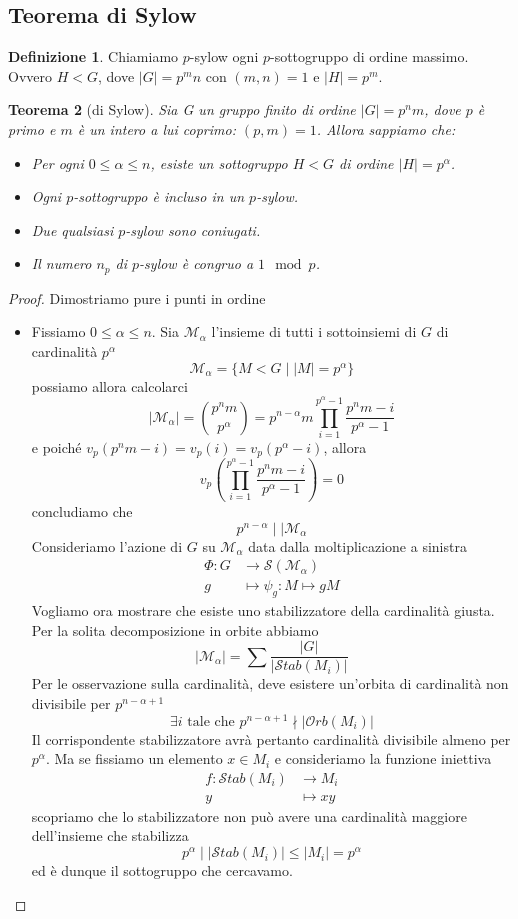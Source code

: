 \documentclass[a4paper]{article}
\newtheorem{theorem}{Teorema}[section]
\theoremstyle{remark}
\theoremstyle{definition}
\newtheorem{definition}[theorem]{Definizione}
\newcommand{\Orb}[1]{\mathcal{O}rb\left( #1 \right)}
\newcommand{\Stab}[1]{\mathcal{S}tab\left( #1 \right)}
\newcommand{\fun}[5]{\begin{align*}
	#1 \colon #2 &\to #3 \\
	#4 &\mapsto #5
	\end{align*}}
\begin{document}
\subsection{Teorema di Sylow}
\begin{multicols}{2}
	\begin{definition}
		Chiamiamo $ p $-sylow ogni $ p $-sottogruppo di ordine massimo. Ovvero $ H < G $, dove $ |G| = p^mn $ con $ (m, n) = 1 $ e $ |H| = p^m $.
	\end{definition}
\begin{theorem}[di Sylow]\label{sylow}
	Sia G un gruppo finito di ordine $ |G| = p^nm  $, dove $ p $ è primo e $ m $ è un intero a lui coprimo: $ (p, m) = 1 $. Allora sappiamo che:
	\begin{itemize}
		\item[$ \exists $.] Per ogni $ 0 \leq \alpha \leq n $, esiste un sottogruppo $ H<G $ di ordine $|H| = p^\alpha $.
		\item[$ \subseteq $.] Ogni $ p $-sottogruppo è incluso in un $ p $-sylow.
		\item[$ \varphi_g $.] Due qualsiasi $ p $-sylow sono coniugati.
		\item[$ n_p $.] Il numero $ n_p $ di $ p $-sylow è congruo a $ 1 \mod{p}$.
	\end{itemize}
\end{theorem}
\begin{proof}
		Dimostriamo pure i punti in ordine
	\begin{itemize}

		\item[$ \exists $.] Fissiamo $ 0 \leq \alpha \leq n $. Sia $ \mathcal{M}_\alpha $ l'insieme di tutti i sottoinsiemi di $ G $ di cardinalità $ p^\alpha $ \[ \mathcal{M}_\alpha = \{ M < G \mid |M| = p^\alpha \} \] possiamo allora calcolarci
		\[ |\mathcal{M}_\alpha| = {p^nm \choose p^\alpha} = p^{n-\alpha}m \prod_{i = 1}^{p^\alpha - 1}\frac{p^nm-i}{p^\alpha -1} \]
		e poiché $ v_p({p^nm-i}) = v_p(i) =  v_p({p^\alpha -i}) $, allora
		$$  v_p\left(\prod_{i = 1}^{p^\alpha - 1}\frac{p^nm-i}{p^\alpha -1}\right) =  0  $$
		concludiamo che
		\[ p^{n-\alpha} \mid\mid \mathcal{M}_\alpha \]
		Consideriamo l'azione di $ G $ su $ \mathcal{M}_\alpha $ data dalla moltiplicazione a sinistra
		\fun{\Phi}{G}{\mathcal{S}(\mathcal{M}_\alpha)}{g}{\psi_g: M \mapsto gM}
		Vogliamo ora mostrare che esiste uno stabilizzatore della cardinalità giusta. Per la solita decomposizione in orbite abbiamo
		\[ |\mathcal{M}_\alpha| = \sum \frac{|G|}{|\Stab{M_i}|} \]
		Per le osservazione sulla cardinalità, deve esistere un'orbita di cardinalità non divisibile per $ p^{n-\alpha +1} $
		\[ \exists i \text{ tale che }  p^{n-\alpha +1}\nmid |\Orb{M_i}| \]
		 Il corrispondente stabilizzatore avrà pertanto cardinalità divisibile almeno per $ p^\alpha $.
		 Ma se fissiamo un elemento $ x \in M_i $ e consideriamo la funzione iniettiva
		 \fun{f}{\Stab{M_i}}{M_i}{y}{xy}
		 scopriamo che lo stabilizzatore non può avere una cardinalità maggiore dell'insieme che stabilizza
		 \[ p^\alpha \mid |\Stab{M_i}| \leq |M_i| = p^\alpha \]
		 ed è dunque il sottogruppo che cercavamo.
		

\end{itemize}
\end{proof}
\end{multicols}
\end{document}
